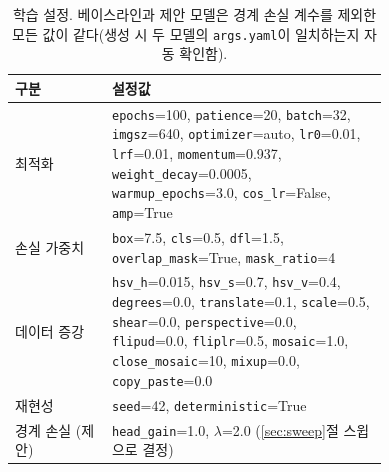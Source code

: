 \begin{table}[htbp]
\centering
\small
\caption[학습 설정.]{학습 설정. 베이스라인과 제안 모델은 경계 손실 계수를 제외한 모든 값이 같다(생성 시 두 모델의 \texttt{args.yaml}이 일치하는지 자동 확인함).}
\label{tab:hparams}
\begin{adjustbox}{max width=\linewidth}
\begin{tabular}{lp{0.74\linewidth}}
\toprule
구분 & 설정값 \\
\midrule
최적화 & \parbox[t]{0.72\linewidth}{\raggedright \texttt{epochs}=100, \texttt{patience}=20, \texttt{batch}=32, \texttt{imgsz}=640, \texttt{optimizer}=auto, \texttt{lr0}=0.01, \texttt{lrf}=0.01, \texttt{momentum}=0.937, \texttt{weight\_decay}=0.0005, \texttt{warmup\_epochs}=3.0, \texttt{cos\_lr}=False, \texttt{amp}=True} \\
손실 가중치 & \parbox[t]{0.72\linewidth}{\raggedright \texttt{box}=7.5, \texttt{cls}=0.5, \texttt{dfl}=1.5, \texttt{overlap\_mask}=True, \texttt{mask\_ratio}=4} \\
데이터 증강 & \parbox[t]{0.72\linewidth}{\raggedright \texttt{hsv\_h}=0.015, \texttt{hsv\_s}=0.7, \texttt{hsv\_v}=0.4, \texttt{degrees}=0.0, \texttt{translate}=0.1, \texttt{scale}=0.5, \texttt{shear}=0.0, \texttt{perspective}=0.0, \texttt{flipud}=0.0, \texttt{fliplr}=0.5, \texttt{mosaic}=1.0, \texttt{close\_mosaic}=10, \texttt{mixup}=0.0, \texttt{copy\_paste}=0.0} \\
재현성 & \parbox[t]{0.72\linewidth}{\raggedright \texttt{seed}=42, \texttt{deterministic}=True} \\
경계 손실 (제안) & \texttt{head\_gain}=1.0, $\lambda$=2.0 (\ref{sec:sweep}절 스윕으로 결정) \\
\bottomrule
\end{tabular}
\end{adjustbox}
\end{table}
